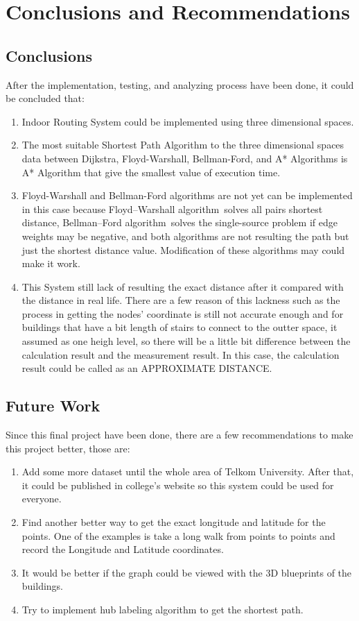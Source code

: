 \chapter{Conclusions and Recommendations}
\section{Conclusions}
After the implementation, testing, and analyzing process have been done, it could be concluded that:
\begin{enumerate}
	\item Indoor Routing System could be implemented using three dimensional spaces.
	
	\item The most suitable Shortest Path Algorithm to the three dimensional spaces data between Dijkstra, Floyd-Warshall, Bellman-Ford, and A* Algorithms is A* Algorithm that give the smallest value of execution time.
	
	\item Floyd-Warshall and Bellman-Ford algorithms are not yet can be implemented in this case because Floyd–Warshall algorithm solves all pairs shortest distance, Bellman–Ford algorithm solves the single-source problem if edge weights may be negative, and both algorithms are not resulting the path but just the shortest distance value. Modification of these algorithms may could make it work.
	
	\item This System still lack of resulting the exact distance after it compared with the distance in real life. There are a few reason of this lackness such as the process in getting the nodes’ coordinate is still not accurate enough and for buildings that have a bit length of stairs to connect to the outter space, it assumed as one heigh level, so there will be a little bit difference between the calculation result and the measurement result. In this case, the calculation result could be called as an APPROXIMATE DISTANCE.
	
\end{enumerate}

\vspace{40mm}
\section{Future Work}
Since this final project have been done, there are a few recommendations to make this project better, those are:
\begin{enumerate}
	\item Add some more dataset until the whole area of Telkom University. After that, it could be published in college's website so this system could be used for everyone.
	\item Find another better way to get the exact longitude and latitude for the points. One of the examples is take a long walk from points to points and record the Longitude and Latitude coordinates.
	\item It would be better if the graph could be viewed with the 3D blueprints of the buildings. 
	\item Try to implement hub labeling algorithm to get the shortest path. 
	
\end{enumerate}
